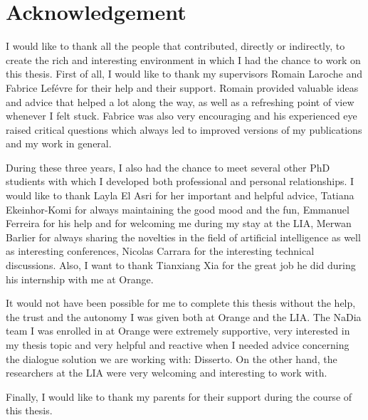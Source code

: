 \chapter*{Acknowledgement}

        I would like to thank all the people that contributed, directly or indirectly, to create the rich and interesting environment in which I had the chance to work on this thesis. First of all, I would like to thank my supervisors Romain Laroche and Fabrice Lef\'evre for their help and their support. Romain provided valuable ideas and advice that helped a lot along the way, as well as a refreshing point of view whenever I felt stuck. Fabrice was also very encouraging and his experienced eye raised critical questions which always led to improved versions of my publications and my work in general.

        During these three years, I also had the chance to meet several other PhD studients with which I developed both professional and personal relationships. I would like to thank Layla El Asri for her important and helpful advice, Tatiana Ekeinhor-Komi for always maintaining the good mood and the fun, Emmanuel Ferreira for his help and for welcoming me during my stay at the LIA, Merwan Barlier for always sharing the novelties in the field of artificial intelligence as well as interesting conferences, Nicolas Carrara for the interesting technical discussions. Also, I want to thank Tianxiang Xia for the great job he did during his internship with me at Orange.

        It would not have been possible for me to complete this thesis without the help, the trust and the autonomy I was given both at Orange and the LIA. The NaDia team I was enrolled in at Orange were extremely supportive, very interested in my thesis topic and very helpful and reactive when I needed advice concerning the dialogue solution we are working with: Disserto. On the other hand, the researchers at the LIA were very welcoming and interesting to work with.

        Finally, I would like to thank my parents for their support during the course of this thesis.

        
